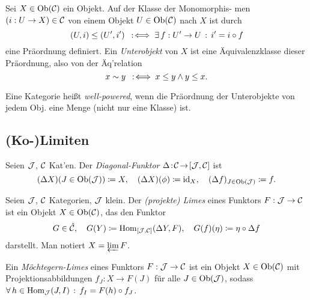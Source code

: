 \documentclass{cheat-sheet}
\begin{document}
\begin{defn}
  Sei $X \in \operatorname{Ob}(\mathcal{C})$ ein Objekt. Auf der Klasse der Monomorphis- men $(i : U \to X) \in \mathcal{C}$ von einem Objekt $U \in \operatorname{Ob}(\mathcal{C})$ nach $X$ ist durch
  \[ (U, i) \leq (U', i') \enspace:\!\iff \exists \, {f : U' \to U} \,:\, i' = i \circ f \]
  eine Präordnung definiert. Ein \emph{Unterobjekt} von $X$ ist eine Äquivalenzklasse dieser Präordnung, also von der Äq'relation
  \[ x \sim y \enspace:\!\iff x \leq y \wedge y \leq x. \]
\end{defn}

\begin{defn}
  Eine Kategorie heißt \emph{well-powered}, wenn die Präordnung der Unterobjekte von jedem Obj. eine Menge (nicht nur eine Klasse) ist.
\end{defn}


\begin{samepage}
  \subsection{(Ko-)Limiten}
\end{samepage}


\begin{defn}
  Seien $\mathcal{J}$, $\mathcal{C}$ Kat'en.
  Der \emph{Diagonal-Funktor} $\Delta \!:\! \mathcal{C} \!\to\! [\mathcal{J}, \mathcal{C}]$ ist
  \[
    (\Delta X)(J \in \operatorname{Ob}(\mathcal{J})) \coloneqq X, \quad
    (\Delta X)(\phi) \coloneqq \operatorname{id}_X, \quad
    (\Delta f)_{J \in \operatorname{Ob}(\mathcal{J})} \coloneqq f.
  \]
\end{defn}

\begin{defn}
  Seien $\mathcal{J}$, $\mathcal{C}$ Kategorien, $\mathcal{J}$ klein. Der \emph{(projekte) Limes} eines Funktors $F : \mathcal{J} \to \mathcal{C}$ ist ein Objekt $X \in \operatorname{Ob}(\mathcal{C})$, das den Funktor
  \[
    G \in \hat{\mathcal{C}}, \quad
    G(Y) \coloneqq \operatorname{Hom}_{[\mathcal{J}, \mathcal{C}]}(\Delta Y, F), \quad
    G(f)(\eta) \coloneqq \eta \circ \Delta f
  \]
  darstellt. Man notiert $X = \varprojlim F$.
\end{defn}


\begin{defn}
  Ein \emph{Möchtegern-Limes} eines Funktors $F : \mathcal{J} \to \mathcal{C}$ ist ein Objekt $X \in \operatorname{Ob}(\mathcal{C})$ mit 
  Projektionsabbildungen $f_J : X \to F(J)$ für alle $J \in \operatorname{Ob}(\mathcal{J})$, sodass
  $\forall \, {h \in \operatorname{Hom}_{\mathcal{J}}(J, I)} \,:\, f_I = F(h) \circ f_J$.
\end{defn}
\end{document}
